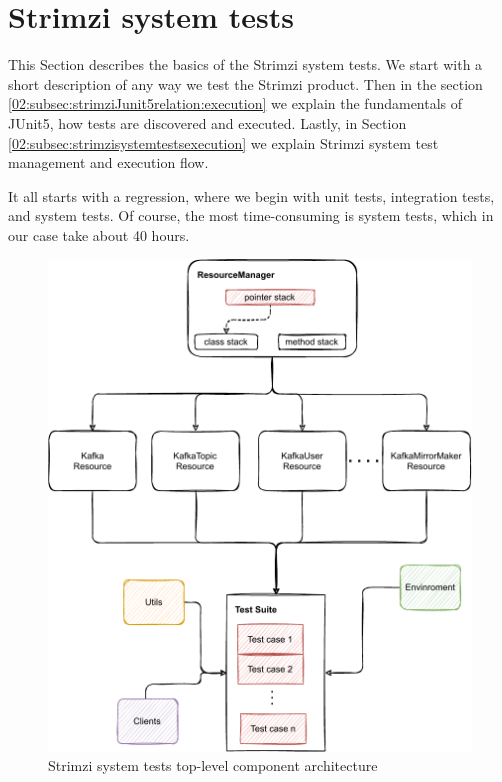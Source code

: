 \section{Strimzi system tests}
\label{02:sec:strimzisystemtests}

This Section describes the basics of the Strimzi system tests.
We start with a short description of any way we test the Strimzi product.
Then in the section \ref{02:subsec:strimziJunit5relation:execution} we explain the fundamentals of JUnit5, how tests are discovered and executed. Lastly, in Section \ref{02:subsec:strimzisystemtestsexecution} we explain Strimzi system test management and execution flow. 

It all starts with a regression, where we begin with unit tests, integration tests, and system tests. Of course, the most time-consuming is system tests, which in our case take about 40 hours. 
\begin{figure}[!ht]
    \centering
    \includegraphics[scale=0.80]{obrazky-figures/02-preliminaries/04-strimzi-system-tests/01-architecture-overall.pdf}
    \caption{Strimzi system tests top-level component architecture}
    \label{02d:fig:strimzisystemtestarch}
\end{figure}
